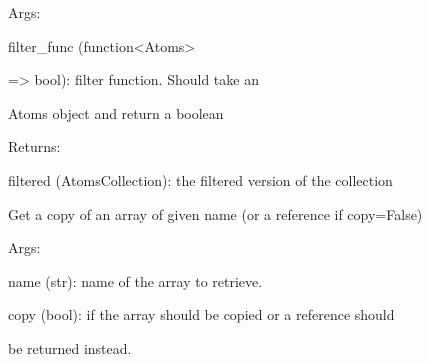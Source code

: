 \documentclass[letterpaper,10pt,english]{sphinxmanual}
\begin{document}
\begin{fulllineitems}
\begin{fulllineitems}
\begin{DUlineblock}{0em}
\item[] Args:
\item[]
\begin{DUlineblock}{\DUlineblockindent}
\item[] filter\_func (function\textless{}Atoms\textgreater{}
\item[]
\begin{DUlineblock}{\DUlineblockindent}
\item[] =\textgreater{} bool): filter function. Should take an
\item[]
\begin{DUlineblock}{\DUlineblockindent}
\item[] Atoms object and return a boolean
\end{DUlineblock}
\end{DUlineblock}
\end{DUlineblock}
\end{DUlineblock}

\begin{DUlineblock}{0em}
\item[] Returns:
\item[]
\begin{DUlineblock}{\DUlineblockindent}
\item[] filtered (AtomsCollection): the filtered version of the collection
\end{DUlineblock}
\end{DUlineblock}

\end{fulllineitems}


\begin{fulllineitems}
\label{doctree/soprano.collection.collection:soprano.collection.collection.AtomsCollection.get_array}
Get a copy of an array of given name (or a reference if copy=False)

\begin{DUlineblock}{0em}
\item[] Args:
\item[]
\begin{DUlineblock}{\DUlineblockindent}
\item[] name (str): name of the array to retrieve.
\item[] copy (bool): if the array should be copied or a reference should
\item[]
\begin{DUlineblock}{\DUlineblockindent}
\item[] be returned instead.
\end{DUlineblock}
\end{DUlineblock}
\end{DUlineblock}


\end{fulllineitems}
\end{fulllineitems}
\end{document}
